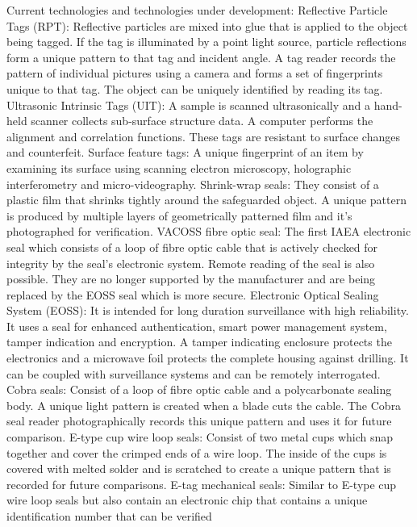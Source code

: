 \documentclass[twocolumn,a4paper]{article}
\begin{document}
Current technologies and technologies under development:
\citep{zarimpas2003} Reflective Particle Tags (RPT): Reflective
particles are mixed into glue that is applied to the object being
tagged. If the tag is illuminated by a point light source, particle
reflections form a unique pattern to that tag and incident angle. A
tag reader records the pattern of individual pictures using a camera
and forms a set of fingerprints unique to that tag. The object can be
uniquely identified by reading its tag. \citep{ellis2007} Ultrasonic Intrinsic Tags
(UIT): A sample is scanned ultrasonically and a hand-held scanner
collects sub-surface structure data. A computer performs the alignment
and correlation functions. These tags are resistant to surface changes
and counterfeit.  Surface feature tags: A unique fingerprint of an
item by examining its surface using scanning electron microscopy,
holographic interferometry and micro-videography.  Shrink-wrap seals:
They consist of a plastic film that shrinks tightly around the
safeguarded object. A unique pattern is produced by multiple layers of
geometrically patterned film and it’s photographed for verification.
VACOSS fibre optic seal: The first IAEA electronic seal which consists
of a loop of fibre optic cable that is actively checked for integrity
by the seal’s electronic system. Remote reading of the seal is also
possible. They are no longer supported by the manufacturer and are
being replaced by the EOSS seal which is more secure. \citep{IAEAsafeguards2011} Electronic
Optical Sealing System (EOSS): It is intended for long duration
surveillance with high reliability. It uses a seal for enhanced
authentication, smart power management system, tamper indication and
encryption. A tamper indicating enclosure protects the electronics and
a microwave foil protects the complete housing against drilling. It
can be coupled with surveillance systems and can be remotely
interrogated. \citep{IAEAsafeguards2011} Cobra seals: Consist of a loop of fibre optic cable
and a polycarbonate sealing body. A unique light pattern is created
when a blade cuts the cable. The Cobra seal reader photographically
records this unique pattern and uses it for future comparison.  E-type
cup wire loop seals: Consist of two metal cups which snap together and
cover the crimped ends of a wire loop. The inside of the cups is
covered with melted solder and is scratched to create a unique pattern
that is recorded for future comparisons.  E-tag mechanical seals:
Similar to E-type cup wire loop seals but also contain an electronic
chip that contains a unique identification number that can be verified
\end{document}
